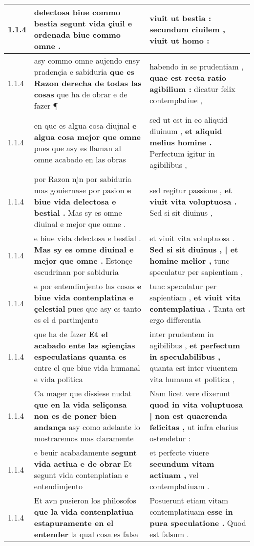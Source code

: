 \begin{tabular}{|p{1cm}|p{6.5cm}|p{6.5cm}|}
1.1.4 & delectosa biue commo bestia \textbf{ segunt vida çiuil e ordenada } biue commo omne . & viuit ut bestia : \textbf{ secundum ciuilem , } viuit ut homo : \\\hline
1.1.4 & asy commo omne aujendo ensy pradençia e sabiduria \textbf{ que es Razon derecha de todas las cosas } que ha de obrar e de fazer ¶ & habendo in se prudentiam , \textbf{ quae est recta ratio agibilium : } dicatur felix contemplatiue , \\\hline
1.1.4 & en que es algua cosa diujnal \textbf{ e algua cosa mejor que omne } pues que asy es llaman al omne acabado en las obras & sed ut est in eo aliquid diuinum , \textbf{ et aliquid melius homine . } Perfectum igitur in agibilibus , \\\hline
1.1.4 & por Razon njn por sabiduria mas gouiernase por pasion \textbf{ e biue vida delectosa e bestial . } Mas sy es omne diuinal e mejor que omne . & sed regitur passione , \textbf{ et viuit vita voluptuosa . } Sed si sit diuinus , \\\hline
1.1.4 & e biue vida delectosa e bestial . \textbf{ Mas sy es omne diuinal e mejor que omne . } Estonçe escudrinan por sabiduria & et viuit vita voluptuosa . \textbf{ Sed si sit diuinus , | et homine melior , } tunc speculatur per sapientiam , \\\hline
1.1.4 & e por entendimjento las cosas \textbf{ e biue vida contenplatina e çelestial } pues que asy es tanto es el d partimjento & tunc speculatur per sapientiam , \textbf{ et viuit vita contemplatiua . } Tanta est ergo differentia \\\hline
1.1.4 & que ha de fazer \textbf{ Et el acabado ente las sçiençias especulatians quanta es } entre el que biue vida humanal e vida politica & inter prudentem in agibilibus , \textbf{ et perfectum in speculabilibus , } quanta est inter viuentem vita humana et politica , \\\hline
1.1.4 & Ca mager que dissiese nudat \textbf{ que en la vida seliçonsa non es de poner bien andança } asy como adelante lo mostraremos mas claramente & Nam licet vere dixerunt \textbf{ quod in vita voluptuosa | non est quaerenda felicitas , } ut infra clarius ostendetur : \\\hline
1.1.4 & e beuir acabadamente \textbf{ segunt vida actiua e de obrar } Et segunt vida contenplatian e entendimjento & et perfecte viuere \textbf{ secundum vitam actiuam , } vel contemplatiuam . \\\hline
1.1.4 & Et avn pusieron los philosofos \textbf{ que la vida contenplatiua estapuramente en el entender } la qual cosa es falsa & Posuerunt etiam vitam contemplatiuam \textbf{ esse in pura speculatione . } Quod est falsum . \\\hline

\end{tabular}
